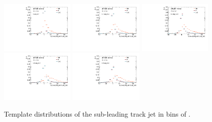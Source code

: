 \begin{figure}[htbp]
  \centering
 \includegraphics[width=0.32\textwidth]{figures/gbb/Sub_Sd0_Fits/Canv_FitTemplate_0-Zp_T-01_LpT_INF_SpT_INF_y.pdf}
 \includegraphics[width=0.32\textwidth]{figures/gbb/Sub_Sd0_Fits/Canv_FitTemplate_01-Zp_T-02_LpT_INF_SpT_INF_y.pdf}
 \includegraphics[width=0.32\textwidth]{figures/gbb/Sub_Sd0_Fits/Canv_FitTemplate_02-Zp_T-03_LpT_INF_SpT_INF_y.pdf}\\
 \includegraphics[width=0.32\textwidth]{figures/gbb/Sub_Sd0_Fits/Canv_FitTemplate_03-Zp_T-04_LpT_INF_SpT_INF_y.pdf}
 \includegraphics[width=0.32\textwidth]{figures/gbb/Sub_Sd0_Fits/Canv_FitTemplate_04-Zp_T-05_LpT_INF_SpT_INF_y.pdf}

\caption{Template \subsdzero distributions of the sub-leading track jet in bins of \zpt. }
  \label{fig:ZpT-template-subleading}
\end{figure}


